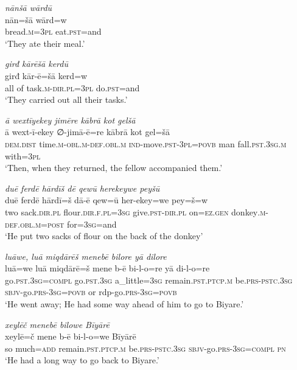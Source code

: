 \ea \label{HB.57}
\textit{nānšā wārdū} \\ 
\gll nān=šā wārd=w \\ 
 bread\textsc{.m}\textsc{=3pl} eat\textsc{.pst}=and \\ 
\glt `They ate their meal.'
\z 
 
\ea \label{HB.58}
\textit{girđ kārēšā kerdū} \\ 
\gll girđ kār-ē=šā kerd=w \\ 
 all of task\textsc{.m}\textsc{-dir}\textsc{.pl}\textsc{=3pl} do\textsc{.pst}=and \\ 
\glt `They carried out all their tasks.'
\z 
 
\ea \label{HB.59}
\textit{ā wextīyekey jimēre kābrā kot gelšā} \\ 
\gll ā wext-ī-ekey ∅-jimā-ē=re kābrā kot gel=šā \\ 
 \textsc{dem.dist} time\textsc{.m}\textsc{-obl}\textsc{.m}\textsc{-def}\textsc{.obl}\textsc{.m} \textsc{ind-}move\textsc{.pst}\textsc{-3pl}\textsc{=\textsc{povb}} man fall\textsc{.pst}\textsc{.3sg}\textsc{.m} with\textsc{=3pl} \\ 
\glt `Then, when they returned, the fellow accompanied them.'
\z 
 
\ea \label{HB.61}
\textit{duē ferdē hārdīš dē qewū herekeywe peyšū} \\ 
\gll duē ferdē hārdī=š dā-ē qew=ū her-ekey=we pey=š=w \\ 
 two sack\textsc{.dir}\textsc{.pl} flour\textsc{.dir}\textsc{\textsc{.f}}\textsc{.pl}\textsc{=3sg} give\textsc{.pst}\textsc{-dir}\textsc{.pl} on\textsc{=ez}\textsc{.gen} donkey\textsc{.m}\textsc{-def}\textsc{.obl}\textsc{.m}\textsc{=\textsc{post}} for\textsc{=3sg}=and \\ 
\glt `He put two sacks of flour on the back of the donkey'
\z 
 
\ea \label{HB.64}
\textit{luāwe, luā miqdārēš menebē bilore yā dilore} \\ 
\gll luā=we luā miqdārē=š mene b-ē bi-l-o=re yā di-l-o=re \\ 
 go\textsc{.pst}\textsc{.3sg}\textsc{=\textsc{compl}} go\textsc{.pst}\textsc{.3sg} a\_little\textsc{=3sg} remain\textsc{.pst}\textsc{.ptcp}\textsc{.m} be\textsc{.prs}\textsc{-pstc}\textsc{.3sg} \textsc{sbjv-}go\textsc{.prs}\textsc{-3sg}\textsc{=\textsc{povb}} or rdp-go\textsc{.prs}\textsc{-3sg}\textsc{=\textsc{povb}} \\ 
\glt `He went away; He had some way ahead of him to go to Biyare.'
\z 
 
\ea \label{HB.65}
\textit{xeylēč menebē bilowe Bīyārē} \\ 
\gll xeylē=č mene b-ē bi-l-o=we Bīyārē \\ 
 so much\textsc{=add} remain\textsc{.pst}\textsc{.ptcp}\textsc{.m} be\textsc{.prs}\textsc{-pstc}\textsc{.3sg} \textsc{sbjv-}go\textsc{.prs}\textsc{-3sg}\textsc{=\textsc{compl}} \textsc{pn} \\ 
\glt `He had a long way to go back to Biyare.'
\z 
 
